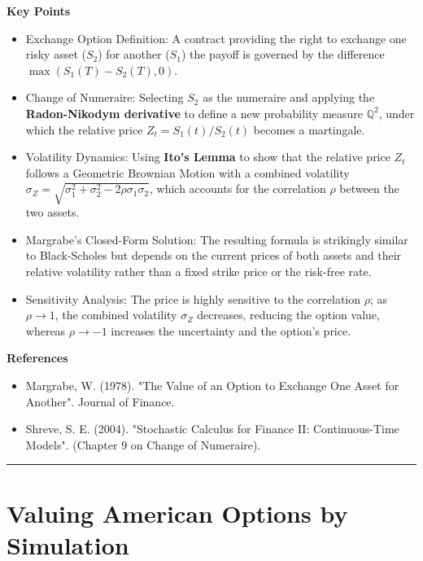 \documentclass[12pt,a4paper]{article}
\begin{document}
\medskip
\textbf{Key Points}
\begin{itemize}
	\item Exchange Option Definition: A contract providing the right to exchange one risky asset ($S_2$) for another ($S_1$) the payoff is governed by the difference $\max(S_1(T)-S_2(T), 0)$.
	
	\item Change of Numeraire: Selecting $S_2$ as the numeraire and applying the \textbf{Radon-Nikodym derivative} to define a new probability measure $\mathbb{Q}^2$, under which the relative price $Z_t = S_1(t)/S_2(t)$ becomes a martingale.
	
	\item Volatility Dynamics: Using \textbf{Ito's Lemma} to show that the relative price $Z_t$ follows a Geometric Brownian Motion with a combined volatility $\sigma_Z = \sqrt{\sigma_1^2 + \sigma_2^2 - 2\rho\sigma_1\sigma_2}$, which accounts for the correlation $\rho$ between the two assets.
	
	\item Margrabe’s Closed-Form Solution: The resulting formula is strikingly similar to Black-Scholes but depends on the current prices of both assets and their relative volatility rather than a fixed strike price or the risk-free rate.
	
	\item Sensitivity Analysis: The price is highly sensitive to the correlation $\rho$; as $\rho \to 1$, the combined volatility $\sigma_Z$ decreases, reducing the option value, whereas $\rho \to -1$ increases the uncertainty and the option's price.
\end{itemize}

\medskip
\textbf{References}
\begin{itemize}
	\item[-] Margrabe, W. (1978). "The Value of an Option to Exchange One Asset for Another". Journal of Finance.
	\item[-] Shreve, S. E. (2004). "Stochastic Calculus for Finance II: Continuous-Time Models". (Chapter 9 on Change of Numeraire).	
\end{itemize}

\vspace{0.5cm}
\hrule
\vspace{0.5cm}

\section{Valuing American Options by Simulation}
\end{document}
